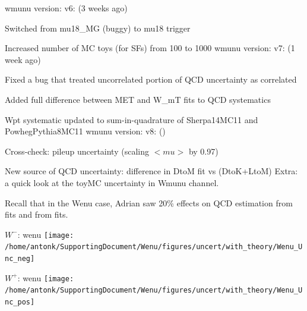 

{
wmunu version: v6: (3 weeks ago)
\iteb
\item Switched from mu18\_MG (buggy) to mu18 trigger
\item Increased number of MC toys (for SFs) from 100 to 1000
\itee
wmunu version: v7: (1 week ago)
\iteb
\item Fixed a bug that treated uncorrelated portion of QCD uncertainty as correlated
\item Added full difference between MET and W\_mT fits to QCD systematics
\item Wpt systematic updated to sum-in-quadrature of Sherpa14MC11 and PowhegPythia8MC11
\itee
wmunu version: v8: ()
\iteb
\item Cross-check: pileup uncertainty (scaling $<mu>$ by 0.97)
\item New source of QCD uncertainty: difference in DtoM fit vs (DtoK+LtoM)
\itee
Extra: a quick look at the toyMC uncertainty in Wmunu channel.
}

{
Recall that in the Wenu case, Adrian saw 20\% effects on QCD estimation from  fits and from  fits.
}

{
\colb[T]
\centering
\small{ $W^{-}$: wenu}
\texttt{[image: /home/antonk/SupportingDocument/Wenu/figures/uncert/with\_theory/Wenu\_Unc\_neg]}

\centering
\small{ $W^{+}$: wenu}
\texttt{[image: /home/antonk/SupportingDocument/Wenu/figures/uncert/with\_theory/Wenu\_Unc\_pos]}
\cole
}

